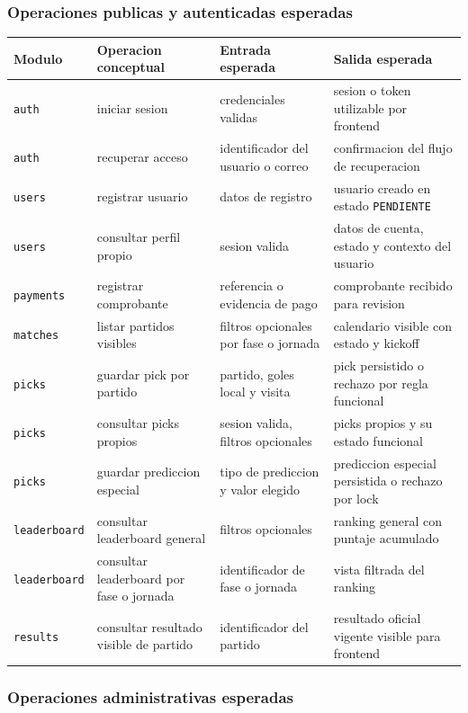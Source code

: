 \subsubsection{Operaciones publicas y autenticadas esperadas}

\begin{longtable}{p{}p{}p{}p{}}
\toprule
\textbf{Modulo} & \textbf{Operacion conceptual} & \textbf{Entrada esperada} & \textbf{Salida esperada} \\
\midrule
\texttt{auth} & iniciar sesion & credenciales validas & sesion o token utilizable por frontend \\
\texttt{auth} & recuperar acceso & identificador del usuario o correo & confirmacion del flujo de recuperacion \\
\texttt{users} & registrar usuario & datos de registro & usuario creado en estado \texttt{PENDIENTE} \\
\texttt{users} & consultar perfil propio & sesion valida & datos de cuenta, estado y contexto del usuario \\
\texttt{payments} & registrar comprobante & referencia o evidencia de pago & comprobante recibido para revision \\
\texttt{matches} & listar partidos visibles & filtros opcionales por fase o jornada & calendario visible con estado y kickoff \\
\texttt{picks} & guardar pick por partido & partido, goles local y visita & pick persistido o rechazo por regla funcional \\
\texttt{picks} & consultar picks propios & sesion valida, filtros opcionales & picks propios y su estado funcional \\
\texttt{picks} & guardar prediccion especial & tipo de prediccion y valor elegido & prediccion especial persistida o rechazo por lock \\
\texttt{leaderboard} & consultar leaderboard general & filtros opcionales & ranking general con puntaje acumulado \\
\texttt{leaderboard} & consultar leaderboard por fase o jornada & identificador de fase o jornada & vista filtrada del ranking \\
\texttt{results} & consultar resultado visible de partido & identificador del partido & resultado oficial vigente visible para frontend \\
\bottomrule
\end{longtable}

\subsubsection{Operaciones administrativas esperadas}

